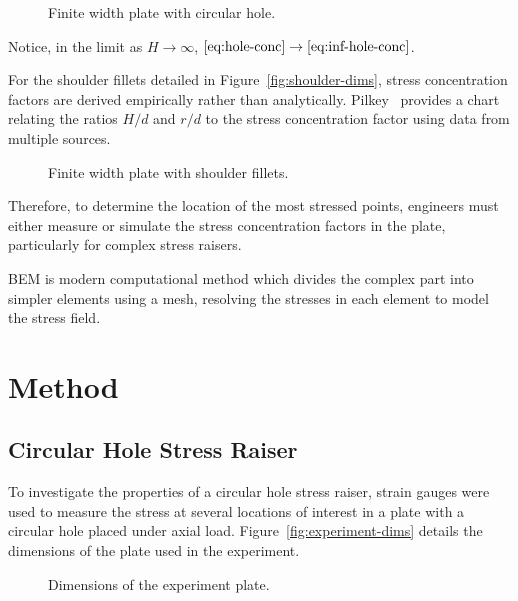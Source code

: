 \documentclass[a4paper,11pt,twocolumn]{article}
\newcommand{\BEM}{\textsc{BEM}\xspace}
\begin{document}
\begin{figure}[h]
    \centering
    \def\svgwidth{0.48\textwidth}
    
    \caption{Finite width plate with circular hole.}
    \label{fig:hole-dims}
\end{figure}

Notice, in the limit as $H\rightarrow\infty$,
$\eqref{eq:hole-conc}\rightarrow\eqref{eq:inf-hole-conc}$.

For the shoulder fillets detailed in Figure~\vref{fig:shoulder-dims}, stress
concentration factors are derived empirically rather than analytically.
\mbox{Pilkey~\cite[p.~151]{pilkey2008peterson}} provides a chart relating the
ratios $H/d$ and $r/d$ to the stress concentration factor using data from
multiple sources.

\begin{figure}[h]
    \centering
    \def\svgwidth{0.48\textwidth}
    
    \caption{Finite width plate with shoulder fillets.}
    \label{fig:shoulder-dims}
\end{figure}

Therefore, to determine the location of the most stressed points, engineers must
either measure or simulate the stress concentration factors in the plate,
particularly for complex stress raisers.

\BEM is modern computational method which divides the complex part into simpler 
elements using a mesh, resolving the stresses in each element to model the 
stress field.

\section{Method}

\subsection{Circular Hole Stress Raiser}

To investigate the properties of a circular hole stress raiser, strain gauges
were used to measure the stress at several locations of interest in a plate 
with a circular hole placed under axial load. Figure~\vref{fig:experiment-dims} 
details the dimensions of the plate used in the experiment.

\begin{figure}[h]
    \centering
    \def\svgwidth{0.48\textwidth}
    
    \caption{Dimensions of the experiment plate.}
    \label{fig:experiment-dims}
\end{figure}
\end{document}
